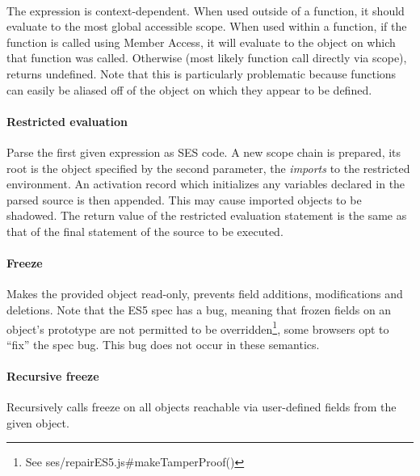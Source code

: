 \documentclass[a4paper]{article}
\begin{document}
\paragraph{} The  expression is context-dependent. When used
outside of a
function, it should evaluate to the most global accessible scope.
When used within a function, if the function is called using Member Access, it
will evaluate to the object on which that function was called. Otherwise
(most likely function call directly via scope),
 returns undefined. Note that this is particularly
problematic because functions can easily be aliased off of the object on which
they appear to be defined.

\paragraph{Restricted evaluation} Parse the first given expression as SES code.
A new scope chain is prepared, its root is the
object specified by the second parameter, the \emph{imports} to the restricted
environment.
An activation record which initializes any variables declared in the parsed
source is then appended. This may cause imported objects to be shadowed.
The return value of the restricted evaluation statement is the same as that of
the final statement of the source to be executed.

\paragraph{Freeze} Makes the provided object read-only, prevents field additions,
modifications and deletions.
Note that the ES5 spec has a bug, meaning that frozen fields on an object's
prototype are not permitted to be overridden\footnote{See
ses/repairES5.js\#makeTamperProof()}, some browsers opt to ``fix'' the spec bug.
This bug does not occur in these semantics.

\paragraph{Recursive freeze} Recursively calls freeze on all objects reachable
via user-defined fields from the given object.
\end{document}
